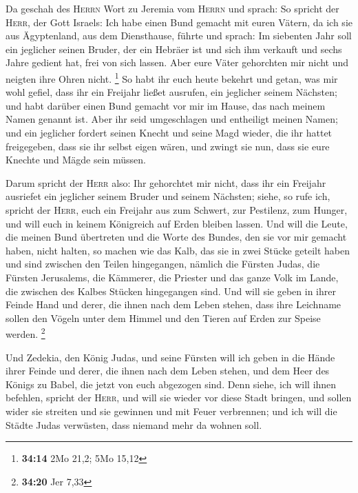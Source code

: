  Da geschah des \textsc{Herrn} Wort zu Jeremia vom
\textsc{Herrn} und sprach:  So spricht der \textsc{Herr},
der Gott Israels: Ich habe einen Bund gemacht mit euren Vätern, da ich
sie aus Ägyptenland, aus dem Diensthause, führte und sprach:
 Im siebenten Jahr soll ein jeglicher seinen Bruder, der
ein Hebräer ist und sich ihm verkauft und sechs Jahre gedient hat, frei
von sich lassen. Aber eure Väter gehorchten mir nicht und neigten ihre
Ohren nicht. \footnote{\textbf{34:14} 2Mo 21,2; 5Mo 15,12}
 So habt ihr euch heute bekehrt und getan, was mir wohl
gefiel, dass ihr ein Freijahr ließet ausrufen, ein jeglicher seinem
Nächsten; und habt darüber einen Bund gemacht vor mir im Hause, das nach
meinem Namen genannt ist.  Aber ihr seid umgeschlagen und
entheiligt meinen Namen; und ein jeglicher fordert seinen Knecht und
seine Magd wieder, die ihr hattet freigegeben, dass sie ihr selbst eigen
wären, und zwingt sie nun, dass sie eure Knechte und Mägde sein müssen.

 Darum spricht der \textsc{Herr} also: Ihr gehorchtet mir
nicht, dass ihr ein Freijahr ausriefet ein jeglicher seinem Bruder und
seinem Nächsten; siehe, so rufe ich, spricht der \textsc{Herr}, euch ein
Freijahr aus zum Schwert, zur Pestilenz, zum Hunger, und will euch in
keinem Königreich auf Erden bleiben lassen.  Und will die
Leute, die meinen Bund übertreten und die Worte des Bundes, den sie vor
mir gemacht haben, nicht halten, so machen wie das Kalb, das sie in zwei
Stücke geteilt haben und sind zwischen den Teilen hingegangen,
 nämlich die Fürsten Judas, die Fürsten Jerusalems, die
Kämmerer, die Priester und das ganze Volk im Lande, die zwischen des
Kalbes Stücken hingegangen sind.  Und will sie geben in
ihrer Feinde Hand und derer, die ihnen nach dem Leben stehen, dass ihre
Leichname sollen den Vögeln unter dem Himmel und den Tieren auf Erden
zur Speise werden. \footnote{\textbf{34:20} Jer 7,33}

 Und Zedekia, den König Judas, und seine Fürsten will ich
geben in die Hände ihrer Feinde und derer, die ihnen nach dem Leben
stehen, und dem Heer des Königs zu Babel, die jetzt von euch abgezogen
sind.  Denn siehe, ich will ihnen befehlen, spricht der
\textsc{Herr}, und will sie wieder vor diese Stadt bringen, und sollen
wider sie streiten und sie gewinnen und mit Feuer verbrennen; und ich
will die Städte Judas verwüsten, dass niemand mehr da wohnen soll.

